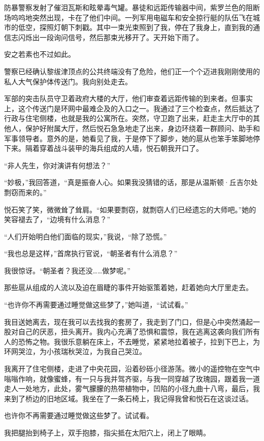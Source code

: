 \documentclass[AutoFakeBold=true]{book}
\begin{document}
防暴警察发射了催泪瓦斯和眩晕毒气罐。暴徒和远距传输器中间，紫罗兰色的阻断场呜呜地突然出现，卡在了他们中间。一列军用电磁车和安全掠行艇的队伍飞在城市的低空，探照灯朝下刺戳。其中一束光束照到了我，停在了我身上，直到我的通信志闪烁出一段询问信号，然后那束光移开了。天开始下雨了。

{\kaishu 安之若素也不过如此。}

警察已经确认黎绂津顶点的公共终端没有了危险，他们正一个个迈进我刚刚使用的私人大气保护体传送门。我向别处走去。

军部的突击队员守卫着政府大楼的大厅，他们审查着远距传输的到来者。但事实上，这个传送门是环网中最难企及的入口之一。我通过了三个检查点，然后抵达了行政与住宅侧楼，也就是我的公寓所在。突然，守卫跑了出来，赶走主大厅中的其他人，保护好附属大厅，然后悦石急急地走了出来，身边环绕着一群顾问、助手和军事领导者。意外的是，她看见了我，于是停下了脚步，她的扈从也笨手笨脚地停下来。隔着穿着战斗装甲的海兵组成的人墙，悦石朝我开口了。

``非人先生，你对演讲有何想法？''

``妙极，''我回答道，``真是振奋人心。如果我没猜错的话，那是从温斯顿·丘吉尔处剽窃而来的。''

悦石笑了笑，微微耸了耸肩。``如果要剽窃，就剽窃人们已经遗忘的大师吧。''她的笑容褪去了，``边境有什么消息？''

``人们开始明白他们面临的现实，''我说，``除了恐慌。''

``我也总是这样，''首席执行官说，``朝圣者有什么消息？''

我很惊讶。``朝圣者？我还没……做梦呢。''

那些扈从组成的人流以及迫在眉睫的事件开始驱策着她，赶着她向大厅里走去。

``也许你不再需要通过睡觉做这些梦了，''她叫道，``试试看。''

我目送她离去，现在我可以去找我的套房了，我走到了门口，但是心中突然涌起一股对自己的厌恶，扭头离开。我内心充满了恐惧和震惊，我在逃离这袭向我们所有人的恐怖之物。我很乐意躺在床上，不去睡觉，紧紧地拉着被子，拉到下巴上，为环网哭泣，为小孩瑞秋哭泣，为我自己哭泣。

我离开了住宅侧楼，走进了中央花园，沿着砂砾小径游荡。微小的遥控物在空气中嗡嗡作响，就像蜜蜂，有一只与我并驾齐驱，与我一同穿越了玫瑰园，跟着我一道走人一处地方，此处，雾气朦朦的热带植物中，凹陷的小径九曲十八弯，最后，我来到了桥边的旧地区域。我坐在了一条石椅上，我记得我曾和悦石在这谈过话。

{\kaishu 也许你不再需要通过睡觉做这些梦了。试试看。}

我把腿抬到椅子上，双手抱膝，指尖抵在太阳穴上，闭上了眼睛。
\end{document}
